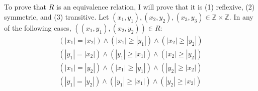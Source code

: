 \documentclass{article}
\begin{document}
\section{}
\subsection{}
To prove that $R$ is an equivalence relation, I will prove that it is (1) reflexive, (2) symmetric, and (3) transitive. Let $(x_1,y_1), (x_2,y_2), (x_3, y_3) \in \mathbb{Z} \times \mathbb{Z}$. In any of the following cases, $((x_1,y_1), (x_2,y_2)) \in R$:
\begin{gather}
    (|x_1| = |x_2|) \land (|x_1| \geq |y_1|) \land (|x_2| \geq |y_2|) \\
    (|y_1| = |x_2|) \land (|y_1| \geq |x_1|) \land (|x_2| \geq |y_2|) \\
    (|x_1| = |y_2|) \land (|x_1| \geq |y_1|) \land (|y_2| \geq |x_2|) \\
    (|y_1| = |y_2|) \land (|y_1| \geq |x_1|) \land (|y_2| \geq |x_2|)
\end{gather}
\end{document}
